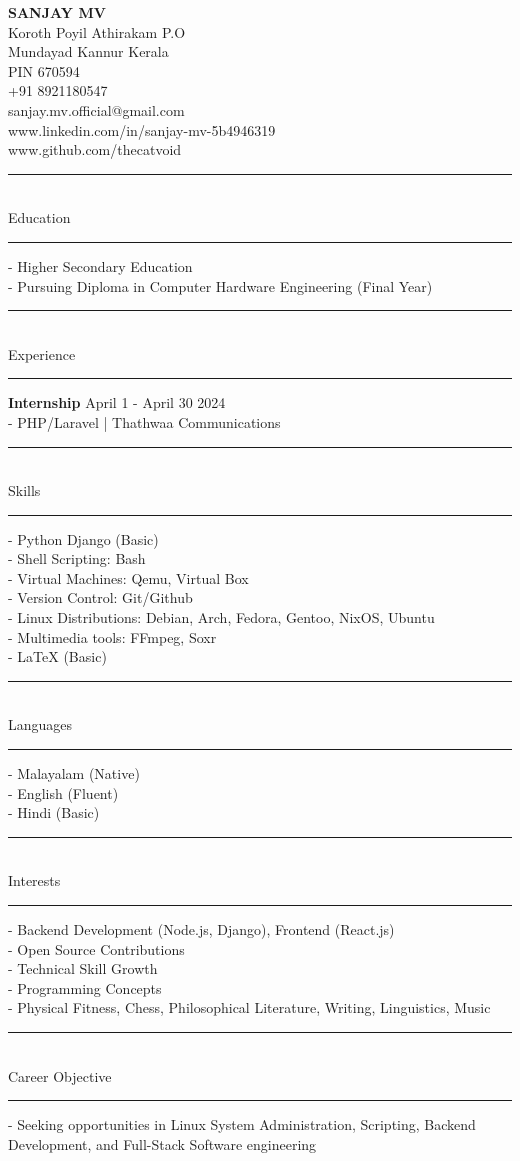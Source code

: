 \documentclass[a4paper,11pt]{article}
\newcommand{\linedtext}[1]{
    \noindent\rule{\textwidth}{0.3mm}\\[0.1em]
    \textcolor[RGB]{110,110,110}{\Large #1} \\[-0.7em]
    \noindent\rule{\textwidth}{0.3mm}
}
\begin{document}
\hspace{-0.5in}
\begin{minipage}[t]{0.4\textwidth}
    \textbf{\huge SANJAY MV} \\[1em]
    \color[RGB]{110,110,110}
    \selectfont
    Koroth Poyil Athirakam P.O \\
    Mundayad Kannur Kerala \\
    PIN 670594 \\[1em]
    +91 8921180547 \\[1em]
    sanjay.mv.official@gmail.com \\
    www.linkedin.com/in/sanjay-mv-5b4946319 \\
    www.github.com/thecatvoid
\end{minipage}

\vspace{-5.5cm}
\hspace{5cm}
\begin{minipage}[t]{0.7\textwidth}
    \linedtext{Education}
    - Higher Secondary Education \\
    - Pursuing Diploma in Computer Hardware Engineering (Final Year)
    \vspace{0.3cm}

    \linedtext{Experience}
    \textbf{Internship} \hspace{5cm} April 1 - April 30 2024 \\
    - PHP/Laravel | Thathwaa Communications
    \vspace{0.3cm}

    \linedtext{Skills}
    - Python Django (Basic) \\
    - Shell Scripting: Bash \\
    - Virtual Machines: Qemu, Virtual Box \\
    - Version Control: Git/Github \\
    - Linux Distributions: Debian, Arch, Fedora, Gentoo, NixOS, Ubuntu \\
    - Multimedia tools: FFmpeg, Soxr \\
    - LaTeX (Basic)
    \vspace{0.3cm}

    \linedtext{Languages}
    - Malayalam (Native) \\
    - English (Fluent) \\
    - Hindi (Basic)
    \vspace{0.3cm}

    \linedtext{Interests}
    - Backend Development (Node.js, Django), Frontend (React.js) \\
    - Open Source Contributions \\
    - Technical Skill Growth \\
    - Programming Concepts \\
    - Physical Fitness, Chess, Philosophical Literature, Writing, Linguistics, Music
    \vspace{0.3cm}

    \linedtext{Career Objective}
    - Seeking opportunities in Linux System Administration, Scripting, Backend Development, and Full-Stack Software engineering
\end{minipage}
\end{document}
